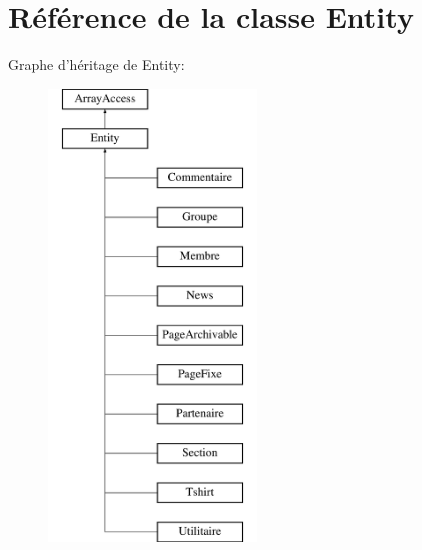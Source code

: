 \hypertarget{class_library_1_1_entity}{\section{Référence de la classe Entity}
\label{class_library_1_1_entity}
}
Graphe d'héritage de Entity\+:\begin{figure}[H]
\begin{center}
\leavevmode
\includegraphics[height=12.000000cm]{class_library_1_1_entity}
\end{center}
\end{figure}
